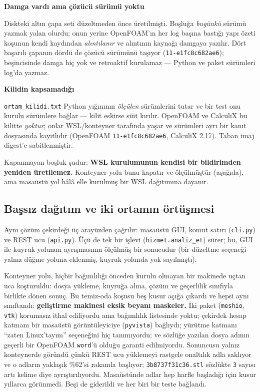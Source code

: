 \documentclass[11pt,a4paper]{article}
\newcommand{\kkkenar}{lacivert}
\newcommand{\kkzemin}{kod}
\newenvironment{renkkutu}[3]{%
  \renewcommand{\kkkenar}{#1}\renewcommand{\kkzemin}{#2}%
  \par\medskip\noindent
  \begin{lrbox}{\kutugovde}%
  \begin{minipage}{\dimexpr\linewidth-2\fboxsep-2\fboxrule\relax}\footnotesize
  \textcolor{#1}{\textbf{#3}}\par\vspace{3pt}%
}{%
  \end{minipage}%
  \end{lrbox}%
  \noindent\fcolorbox{\kkkenar}{\kkzemin}{\usebox{\kutugovde}}%
  \par\medskip
}
\newenvironment{dikkat}[1]{\begin{renkkutu}{orta}{ortabg}{#1}}{\end{renkkutu}}
\begin{document}
\begin{dikkat}{Damga vardı ama çözücü sürümü yoktu}
Diskteki altın çapa seti düzeltmeden önce üretilmişti. Boşluğa \emph{bugünkü}
sürümü yazmak yalan olurdu; onun yerine OpenFOAM'ın her log başına bastığı
yapı özeti koşunun kendi kaydından \emph{alıntılanır} ve alıntının kaynağı
damgaya yazılır. Dört başarılı çapanın dördü de çözücü sürümünü taşıyor
(\texttt{11-e1fc8c682ae6}); beşincisinde damga hiç yok ve retroaktif
kurulamaz --- Python ve paket sürümleri log'da yazmaz.
\end{dikkat}

\begin{dikkat}{Kilidin kapsamadığı}
\texttt{ortam\_kilidi.txt} Python yığınının \emph{ölçülen} sürümlerini tutar ve
bir test onu kurulu sürümlere bağlar --- kilit eskirse süit kırılır. OpenFOAM ve
CalculiX bu kilitte \emph{yoktur}; onlar WSL/konteyner tarafında yaşar ve
sürümleri ayrı bir kanıt dosyasında kayıtlıdır (OpenFOAM
\texttt{11-e1fc8c682ae6}, CalculiX 2.17). Taban imaj digest'e sabitlenmiştir.

Kapanmayan boşluk şudur: \textbf{WSL kurulumunun kendisi bir bildirimden
yeniden üretilemez.} Konteyner yolu bunu kapatır ve ölçülmüştür (aşağıda), ama
masaüstü yol hâlâ elle kurulmuş bir WSL dağıtımına dayanır.
\end{dikkat}

\subsection{Başsız dağıtım ve iki ortamın örtüşmesi}
\label{sub:bassiz}

Aynı çözüm çekirdeği üç arayüzden çağrılır: masaüstü GUI, komut satırı
(\texttt{cli.py}) ve REST ucu (\texttt{api.py}). Üçü de tek bir işlevi
(\texttt{hizmet.analiz\_et}) sürer; bu, GUI ile kuyruk yolunun ayrışmasının
ölçülmüş bir sonucudur (bir düzeltme seçeneği yalnız düğme yoluna eklenmiş,
kuyruk yolunda yok sayılmıştı).

Konteyner yolu, hiçbir bağımlılığı önceden kurulu olmayan bir makinede uçtan
uca koşturuldu: dosya yükleme, kuyruğa alma, çözüm ve geçerlilik sınıfıyla
birlikte dönen sonuç. Bu temiz-oda koşusu beş kusur açığa çıkardı ve hepsi aynı
sınıftandı: \textbf{geliştirme makinesi eksik beyanı maskeler.} İki paket
(\texttt{meshio}, \texttt{vtk}) korumasız ithal ediliyordu ama bağımlılık
listesinde yoktu; çekirdek hesap katmanı bir masaüstü görüntüleyiciye
(\texttt{pyvista}) bağlıydı; yürütme katmanı ``zaten Linux'tayım'' seçeneğini
hiç tanımıyordu; ve sözlüğe yazılan dosya adının geçerli bir OpenFOAM
\texttt{word}'ü olduğu garanti edilmiyordu. Sonuncusu yalnız konteynerde
göründü çünkü REST ucu yüklemeyi rastgele onaltılık adla saklıyor ve o adların
yaklaşık \%62'si rakamla başlıyor; \texttt{3b8737f31c36.stl} sözlükte
\texttt{3} sayısı artı kelime diye ayrıştırılıyordu. Masaüstünde adlar hep
harfle başladığı için kusur yıllarca görünmedi. Beşi de giderildi ve her biri
bir teste bağlandı.
\end{document}
